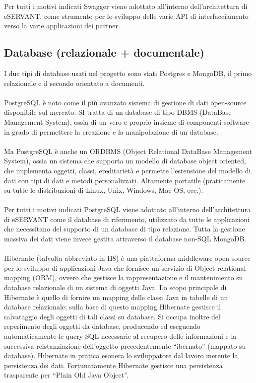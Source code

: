 Per tutti i motivi indicati Swagger viene adottato all’interno dell’architettura di
eSERVANT, come strumento per lo sviluppo delle varie API di interfacciamento verso
la varie applicazioni dei partner.


\subsection{Database (relazionale + documentale)}
I due tipi di database usati nel progetto sono stati Postgres e MongoDB, il primo relazionale e il secondo orientato a documenti.
\paragraph{}

PostgreSQL è noto come il più avanzato sistema di gestione di dati open-source
disponibile sul mercato.
SI tratta di un database di tipo DBMS (DataBase Management System), ossia di un vero e proprio insieme di componenti software in grado di permettere la creazione e la manipolazione di un database.
\paragraph{}

Ma PostgreSQL è anche un ORDBMS (Object Relational DataBase Management System), ossia un sistema che supporta un modello di database object oriented, che implementa oggetti, classi, ereditarietà e permette l’estensione del modello di dati con tipi di dati e metodi
personalizzati.
Altamente portatile (praticamente su tutte le distribuzioni di Linux, Unix, Windows, Mac OS, ecc.).
\paragraph{}

Per tutti i motivi indicati PostgreSQL viene adottato all’interno dell’architettura di eSERVANT come il database di riferimento, utilizzato da tutte le applicazioni che necessitano del supporto di un database di tipo relazione.
Tutta la gestione massiva dei dati viene invece gestita attraverso il database non-SQL
MongoDB.
\paragraph{}

Hibernate (talvolta abbreviato in H8) è una piattaforma middleware open source per lo sviluppo di applicazioni Java che fornisce un servizio di Object-relational mapping (ORM), ovvero che gestisce la rappresentazione e il mantenimento su database relazionale di un sistema di oggetti Java. Lo scopo principale di Hibernate è quello di fornire un mapping delle
classi Java in tabelle di un database relazionale; sulla base di questo
mapping Hibernate gestisce il salvataggio degli oggetti di tali classi su database. Si occupa inoltre del reperimento degli oggetti da database, producendo ed eseguendo automaticamente le query SQL necessarie al recupero delle informazioni e la successiva reistanziazione dell’oggetto precedentemente “ibernato” (mappato su database).
Hibernate in pratica esonera lo sviluppatore dal lavoro inerente la persistenza dei dati.
Fortunatamente Hibernate gestisce una persistenza trasparente per “Plain Old Java
Object”.
